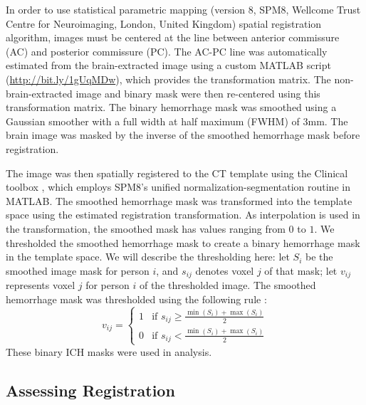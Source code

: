 \documentclass[10pt]{article}\usepackage[]{graphicx}\usepackage[]{color}
\begin{document}
In order to use statistical parametric mapping (version 8, SPM8, Wellcome Trust Centre for Neuroimaging, London, United Kingdom) spatial registration algorithm, images must be centered at the line between anterior commissure (AC) and posterior commissure (PC).  The AC-PC line was automatically estimated from the brain-extracted image using a custom MATLAB script (\url{http://bit.ly/1gUqMDw}), which provides the transformation matrix. 
The non-brain-extracted image and binary mask were then re-centered using this transformation matrix.  The binary hemorrhage mask was smoothed using a Gaussian smoother with a full width at half maximum (FWHM) of $3$mm.  The brain image was masked by the inverse of the smoothed hemorrhage mask before registration. 


The image was then spatially registered to the CT template using the Clinical toolbox \citep{rorden_age-specific_2012}, which employs SPM8's unified normalization-segmentation routine \citep{ashburner_unified_2005} in MATLAB.  The smoothed hemorrhage mask was transformed into the template space using the estimated registration transformation.  As interpolation is used in the transformation, the smoothed mask has values ranging from $0$ to $1$.  We thresholded the smoothed hemorrhage mask to create a binary hemorrhage mask in the template space.  
We will describe the thresholding here: let $S_i$ be the smoothed image mask for person $i$, and $s_{ij}$ denotes voxel $j$ of that mask; let $v_{ij}$ represents voxel $j$ for person $i$ of the thresholded image.  The smoothed hemorrhage mask was thresholded using the following rule \citep{rorden_age-specific_2012}:
$$
v_{ij} =
\begin{cases}
1  & \text{if } s_{ij} \geq \frac{\min(S_i) + \max(S_i)}{2}\\
0  & \text{if } s_{ij} < \frac{\min(S_i) + \max(S_i)}{2}
\end{cases}
$$
These binary ICH masks were used in analysis.  


\subsection{Assessing Registration}
\end{document}
